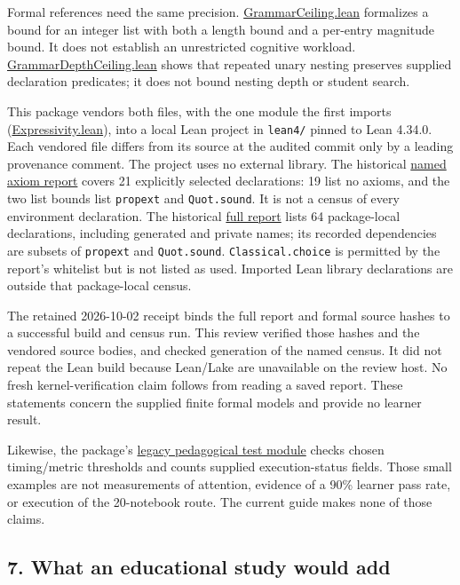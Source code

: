 \documentclass[
  11pt,
]{article}
\newcommand{\passthrough}[1]{#1}
\begin{document}
Formal references need the same precision.
\href{lean4/GrammarCeiling.lean}{GrammarCeiling.lean} formalizes a bound
for an integer list with both a length bound and a per-entry magnitude
bound. It does not establish an unrestricted cognitive workload.
\href{lean4/GrammarDepthCeiling.lean}{GrammarDepthCeiling.lean} shows
that repeated unary nesting preserves supplied declaration predicates;
it does not bound nesting depth or student search.

This package vendors both files, with the one module the first imports
(\href{lean4/Expressivity.lean}{Expressivity.lean}), into a local Lean
project in \texttt{\nolinkurl{lean4/}} pinned to Lean 4.34.0. Each
vendored file differs from its source at the audited commit only by a
leading provenance comment. The project uses no external library. The
historical \href{lean4/axiom_report.txt}{named axiom report} covers 21
explicitly selected declarations: 19 list no axioms, and the two list
bounds list \passthrough{\lstinline!propext!} and
\passthrough{\lstinline!Quot.sound!}. It is not a census of every
environment declaration. The historical
\href{lean4/full_axiom_report.txt}{full report} lists 64 package-local
declarations, including generated and private names; its recorded
dependencies are subsets of \passthrough{\lstinline!propext!} and
\passthrough{\lstinline!Quot.sound!}.
\passthrough{\lstinline!Classical.choice!} is permitted by the report's
whitelist but is not listed as used. Imported Lean library declarations
are outside that package-local census.

The retained 2026-10-02 receipt binds the full report and formal source
hashes to a successful build and census run. This review verified those
hashes and the vendored source bodies, and checked generation of the
named census. It did not repeat the Lean build because Lean/Lake are
unavailable on the review host. No fresh kernel-verification claim
follows from reading a saved report. These statements concern the
supplied finite formal models and provide no learner result.

Likewise, the package's
\href{code/tests/test_007_pedagogical_transmission.py}{legacy
pedagogical test module} checks chosen timing/metric thresholds and
counts supplied execution-status fields. Those small examples are not
measurements of attention, evidence of a 90\% learner pass rate, or
execution of the 20-notebook route. The current guide makes none of
those claims.

\hypertarget{what-an-educational-study-would-add}{%
\subsection{7. What an educational study would
add}\label{what-an-educational-study-would-add}}
\end{document}
